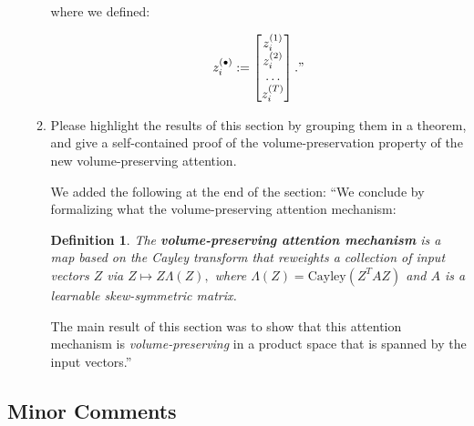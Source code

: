 \documentclass{article}
\newtheorem*{dfntn*}{Definition}
\begin{document}
\begin{enumerate}
\begin{enumerate}[label=\arabic*.]
{    where we defined:
    
    \begin{equation*}
        z_i^{(\bullet)} := \begin{bmatrix} z_i^{(1)} \\ z_i^{(2)} \\ \ldots \\ z_i^{(T)} \end{bmatrix}."
    \end{equation*}}


\item Please highlight the results of this section by grouping them in a theorem, and give a self-contained proof of the volume-preservation property of the new volume-preserving attention.

    {\color{mred} We added the following at the end of the section: ``We conclude by formalizing what the volume-preserving attention mechanism:

    \begin{dfntn*} The \textbf{volume-preserving attention mechanism} is a map based on the Cayley transform that reweights a collection of input vectors \(Z\) via \(Z \mapsto Z\Lambda(Z),\) where \(\Lambda(Z) = \mathrm{Cayley}(Z^TAZ)\) and \(A\) is a learnable skew-symmetric matrix.  \end{dfntn*}

    The main result of this section was to show that this attention mechanism is \textit{volume-preserving} in a product space that is spanned by the input vectors.''}
\end{enumerate}
\end{enumerate}
\subsection*{Minor Comments}
\end{document}

